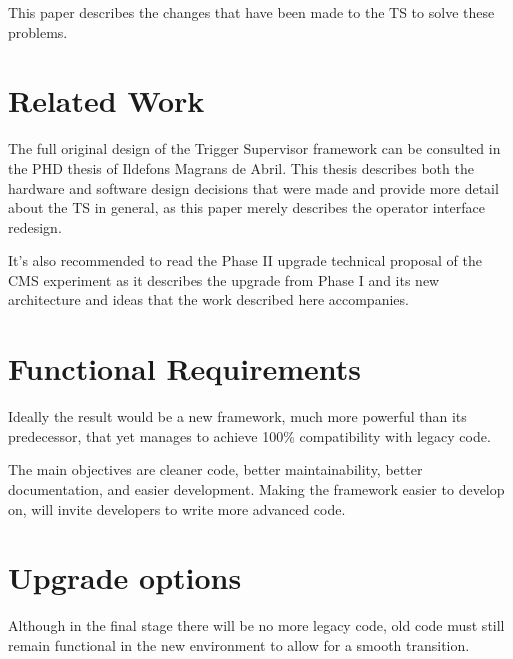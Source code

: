 \documentclass[journal]{IEEEtran}
\begin{document}
This paper describes the changes that have been made to the TS to solve these
problems.

\section{Related Work}
The full original design of the Trigger Supervisor framework can be consulted in
the PHD thesis of Ildefons Magrans de Abril\cite{TS_PHD}. This thesis describes
both the hardware and software design decisions that were made and provide more
detail about the TS in general, as this paper merely describes the operator
interface redesign.

It's also recommended to read the Phase II upgrade technical proposal of the
CMS experiment\cite{TS_Phase2} as it describes the upgrade from Phase I
\cite{CMS_Experiment} and its new architecture and ideas that the work described
here accompanies.


\section{Functional Requirements}
Ideally the result would be a new framework, much more powerful than its
predecessor, that yet manages to achieve 100\% compatibility with legacy code.

The main objectives are cleaner code, better maintainability, better documentation,
and easier development. Making the framework easier to develop on, will invite
developers to write more advanced code.

\section{Upgrade options}
Although in the final stage there will be no more legacy code, old code
must still remain functional in the new environment to allow for a smooth
transition.
\end{document}
